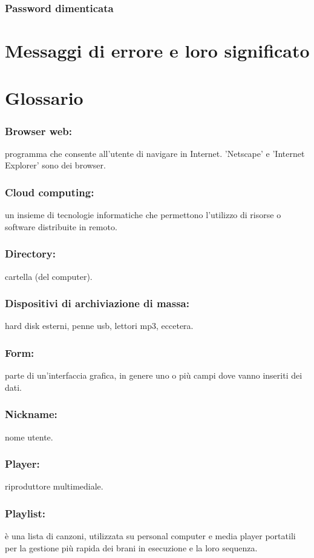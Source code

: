 \subsection*{Password dimenticata}


\appendix %
\chapter{Messaggi di errore e loro significato}
\thispagestyle{fancy}

\chapter{Glossario}
\thispagestyle{fancy}

\subsection*{Browser web:} programma che consente all'utente di navigare in
Internet. 'Netscape' e 'Internet Explorer' sono dei browser. 
\subsection*{Cloud computing:} un insieme di tecnologie informatiche che
permettono l'utilizzo di risorse o software distribuite in remoto.
\subsection*{Directory:} cartella (del computer).
\subsection*{Dispositivi di archiviazione di massa:} hard disk esterni, penne
usb, lettori mp3, eccetera.
\subsection*{Form:} parte di un'interfaccia grafica, in genere uno o pi\`u campi
dove vanno inseriti dei dati. 
\subsection*{Nickname:} nome utente.
\subsection*{Player:} riproduttore multimediale.
\subsection*{Playlist:} \`e una lista di canzoni, utilizzata su
personal computer e media player portatili per la gestione pi\`u rapida dei
brani in esecuzione e la loro sequenza.
